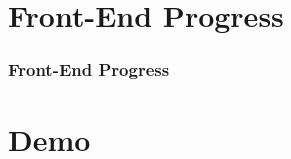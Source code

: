 \documentclass[aspectratio=169, t]{beamer}
\begin{document}
\section{Front-End Progress}
\begin{frame}
  \frametitle{Front-End Progress}

  

\end{frame}

\section{Demo}

\section{}
\maketitle
\end{document}
